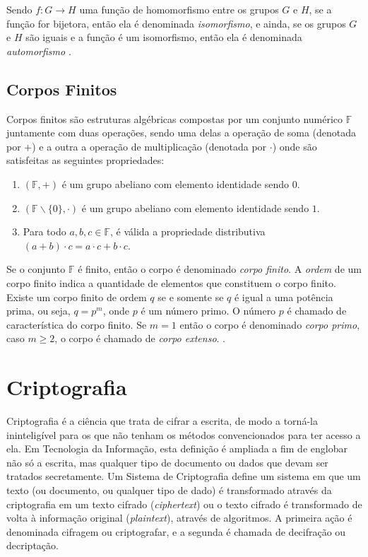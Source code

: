 Sendo $f: G \rightarrow H$ uma função de homomorfismo entre os grupos \(G\) e \(H\), se a função for bijetora, então ela é denominada \textit{isomorfismo}, e ainda, se os grupos \(G\) e \(H\) são iguais e a função é um isomorfismo, então ela é denominada \textit{automorfismo} \cite{Shokranian:2010}.

%
%
\subsection{Corpos Finitos}
Corpos finitos são estruturas algébricas compostas por um conjunto numérico \(\mathbb{F}\) juntamente com duas operações, sendo uma delas a operação de soma (denotada por $+$) e a outra a operação de multiplicação (denotada por $\cdot$) onde são satisfeitas as seguintes propriedades: \cite{Guide}

\begin{enumerate}
\item $(\mathbb{F}, +)$ é um grupo abeliano com elemento identidade sendo \(0\).
\item $(\mathbb{F} \backslash \{0\}, \cdot)$ é um grupo abeliano com elemento identidade sendo $1$.
\item Para todo $a, b, c \in \mathbb{F}$, é válida a propriedade distributiva $(a + b) \cdot c = a \cdot c + b \cdot c$.
\end{enumerate}

Se o conjunto \(\mathbb{F}\) é finito, então o corpo é denominado \textit{corpo finito}. A \textit{ordem} de um corpo finito indica a quantidade de elementos que constituem o corpo finito. Existe um corpo finito de ordem \(q\) se e somente se \(q\) é igual a uma potência prima, ou seja, $q = p^{m}$, onde \(p\) é um número primo. O número \(p\) é chamado de característica do corpo finito. Se $m = 1$ então o corpo é denominado \textit{corpo primo}, caso $m \geq 2$, o corpo é chamado de \textit{corpo extenso}. \cite{Guide}.

%
%
\section{Criptografia} \label{sec:criptografia}
Criptografia é a ciência que trata de cifrar a escrita, de modo a torná-la ininteligível para os que não tenham os métodos convencionados para ter acesso a ela. Em Tecnologia da Informação, esta definição é ampliada a fim de englobar não só a escrita, mas qualquer tipo de documento ou dados que devam ser tratados secretamente. Um Sistema de Criptografia define um sistema em que um texto (ou documento, ou qualquer tipo de dado) é transformado através da criptografia em um texto cifrado (\textit{ciphertext}) ou o texto cifrado é transformado de volta à informação original (\textit{plaintext}), através de algoritmos. A primeira ação é denominada cifragem ou criptografar, e a segunda é chamada de decifração ou decriptação. \cite{Portnoi:2005}

